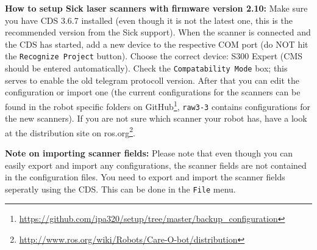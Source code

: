 \textbf{How to setup Sick laser scanners with firmware version 2.10:}
Make sure you have CDS 3.6.7 installed (even though it is not the latest one, this is the recommended version from the Sick support).
When the scanner is connected and the CDS has started, add a new device to the respective COM port (do NOT hit the \texttt{Recognize Project} button).
Choose the correct device: S300 Expert (CMS should be entered automatically).
Check the \texttt{Compatability Mode} box; this serves to enable the old telegram protocoll version.
After that you can edit the configuration or import one (the current configurations for the scanners can be found in the robot specific folders on GitHub\footnote{\url{https://github.com/ipa320/setup/tree/master/backup_configuration}}, \texttt{raw3-3} contains configurations for the new scanners).
If you are not sure which scanner your robot has, have a look at the distribution site on ros.org\footnote{\url{http://www.ros.org/wiki/Robots/Care-O-bot/distribution}}.

\textbf{Note on importing scanner fields:}
Please note that even though you can easily export and import any configurations, the scanner fields are not contained in the configuration files.
You need to export and import the scanner fields seperatly using the CDS.
This can be done in the \texttt{File} menu.

